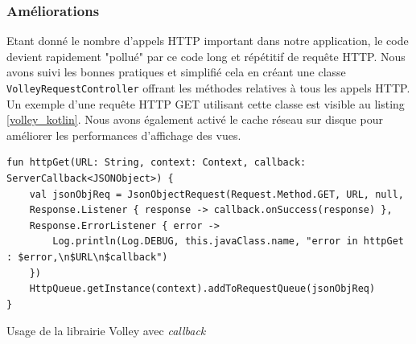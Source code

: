 \subsubsection{Améliorations}
Etant donné le nombre d'appels HTTP important dans notre application, le code devient rapidement "pollué" par ce code long et répétitif de requête HTTP. Nous avons suivi les bonnes pratiques et simplifié cela en créant une classe \texttt{VolleyRequestController} offrant les méthodes relatives à tous les appels HTTP. Un exemple d'une requête HTTP GET utilisant cette classe est visible au listing \ref{volley_kotlin}. Nous avons également activé le cache réseau sur disque pour améliorer les performances d'affichage des vues.
\bigbreak
\begin{code}
    \begin{verbatim}
fun httpGet(URL: String, context: Context, callback: ServerCallback<JSONObject>) {
    val jsonObjReq = JsonObjectRequest(Request.Method.GET, URL, null,
    Response.Listener { response -> callback.onSuccess(response) },
    Response.ErrorListener { error ->
        Log.println(Log.DEBUG, this.javaClass.name, "error in httpGet : $error,\n$URL\n$callback")
    })
    HttpQueue.getInstance(context).addToRequestQueue(jsonObjReq)
}
    \end{verbatim}
    \caption{Usage de la librairie Volley avec \textit{callback}}
    \label{volley_kotlin}
\end{code}
\bigbreak


